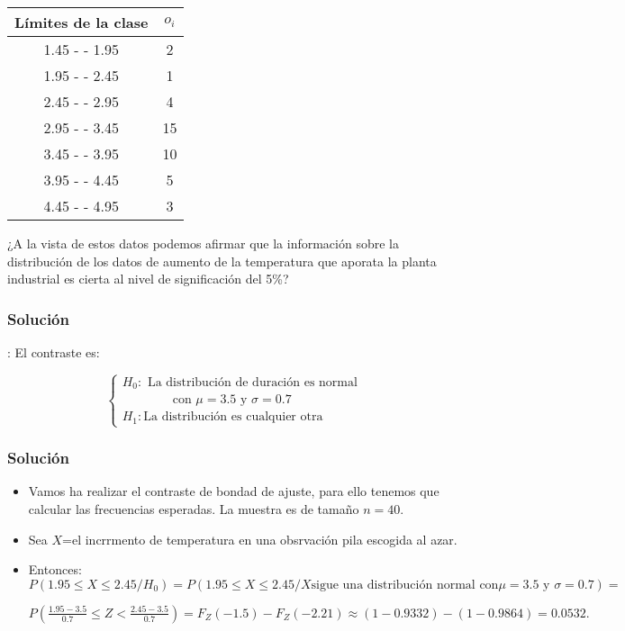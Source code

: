 \begin{frame}
\begin{center}
      \begin{tabular}{|c|c|}
          \hline
          Límites de la clase &$o_{i}$
          \\
          \hline
      1.45 - -  1.95 &   2 \\
      1.95 - -  2.45 &   1 \\
      2.45 - -  2.95 &   4 \\
      2.95 - -  3.45 &  15 \\
      3.45 - -  3.95 &  10 \\
      3.95 - -  4.45 &   5 \\
      4.45 - -  4.95 &   3 \\
      \hline
          \end{tabular}
\end{center}

          ¿A la vista de estos datos podemos afirmar que la información sobre la distribución de los datos de aumento de la temperatura  que aporata  la planta industrial es cierta al nivel de significación del 5\%?
          

   \end{frame}

\begin{frame}
\frametitle{Solución}:
El contraste es:

$$\left\{\begin{array}{l}
H_{0}:\mbox{ La distribución de  duración es normal}\\
\qquad\qquad\mbox{con }
\mu=3.5 \mbox{ y }  \sigma=0.7\\
H_{1}: \mbox{La distribución es  cualquier otra}
\end{array}
\right.$$
\end{frame}

\begin{frame}
\frametitle{Solución}
\begin{itemize}
\item Vamos ha realizar el contraste de bondad de ajuste, para ello tenemos que calcular las frecuencias esperadas. La muestra es de tamaño $n=40$. 
\item Sea $X$=el incrrmento de temperatura en una obsrvación pila escogida al azar.
\item  Entonces:
$P(1.95\leq X\leq 2.45/H_{0})=P(1.95\leq X\leq 2.45/X \mbox{sigue una distribución normal con}\mu=3.5 \mbox{ y } \sigma=0.7)=$ 
         
$P(\frac{1.95-3.5}{0.7}\leq Z<\frac{2.45-3.5}{0.7})=F_{Z}(-1.5)-F_{Z}(-2.21)\approx (1-0.9332)-(1-0.9864)=0.0532.$
\end{itemize}
\end{frame}

